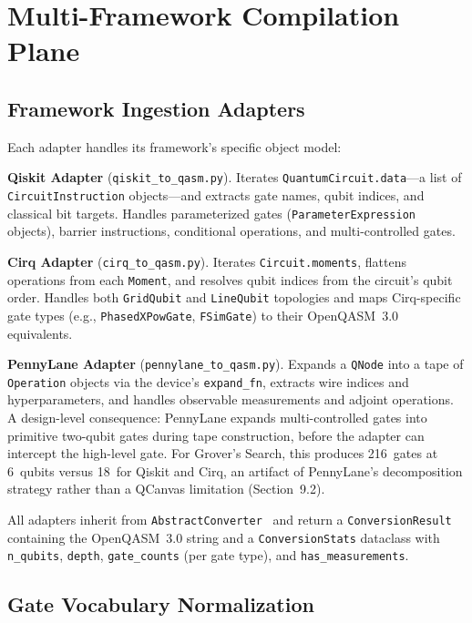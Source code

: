 \documentclass[runningheads]{llncs}
\begin{document}
\section{Multi-Framework Compilation Plane}

\subsection{Framework Ingestion Adapters}

Each adapter handles its framework's specific object model:

\textbf{Qiskit Adapter} (\texttt{qiskit\_to\_qasm.py}). Iterates \texttt{QuantumCircuit.data}---a list of \texttt{CircuitInstruction} objects---and extracts gate names, qubit indices, and classical bit targets. Handles parameterized gates (\texttt{ParameterExpression} objects), barrier instructions, conditional operations, and multi-controlled gates.

\textbf{Cirq Adapter} (\texttt{cirq\_to\_qasm.py}). Iterates \texttt{Circuit.moments}, flattens operations from each \texttt{Moment}, and resolves qubit indices from the circuit's qubit order. Handles both \texttt{GridQubit} and \texttt{LineQubit} topologies and maps Cirq-specific gate types (e.g., \texttt{PhasedXPowGate}, \texttt{FSimGate}) to their OpenQASM~3.0 equivalents.

\textbf{PennyLane Adapter} (\texttt{pennylane\_to\_qasm.py}). Expands a \texttt{QNode} into a tape of \texttt{Operation} objects via the device's \texttt{expand\_fn}, extracts wire indices and hyperparameters, and handles observable measurements and adjoint operations. A design-level consequence: PennyLane expands multi-controlled gates into primitive two-qubit gates during tape construction, before the adapter can intercept the high-level gate. For Grover's Search, this produces 216~gates at 6~qubits versus 18~for Qiskit and Cirq, an artifact of PennyLane's decomposition strategy rather than a QCanvas limitation (Section~9.2).

All adapters inherit from \texttt{AbstractConverter}~\cite{gamma1994} and return a \texttt{ConversionResult} containing the OpenQASM~3.0 string and a \texttt{ConversionStats} dataclass with \texttt{n\_qubits}, \texttt{depth}, \texttt{gate\_counts} (per gate type), and \texttt{has\_measurements}.

\subsection{Gate Vocabulary Normalization}
\end{document}
